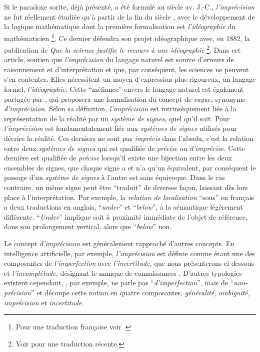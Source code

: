 Si le paradoxe sorite, déjà présenté, a été formulé au
 siècle av. J.-C., \emph{l'imprécision} ne fut
réellement étudiée qu'à partir de la fin du  siècle
\autocite{Williamson1994}, avec le développement de la logique
mathématique dont la première formalisation est \emph{l'idéographie}
du mathématicien \textcite{Frege1879} \footnote{Pour une traduction
  française voir \autocite{Frege1999}.}. Ce dernier défendra son
projet idéographique avec, en 1882, la publication de \emph{Que la
  science justifie le recours à une idéographie} \autocite{Frege1882}
\footnote{Voir \autocite{Frege2019} pour une traduction
  récente.}. Dans cet article,  soutien que
\emph{l'imprécision} du langage naturel est source d'erreurs de
raisonnement et d'interprétation et que, par conséquent, les sciences
ne peuvent s'en contenter. Elles nécessitent un moyen d'expression
plus rigoureux, un langage formel, \emph{l'idéographie.} Cette
\enquote{méfiance} envers le langage naturel est également partagée
par \textcite{Russell1923}, qui proposera une formalisation du concept
de \emph{vague,} synonyme \emph{d'imprécision.} Selon sa définition,
\emph{l'imprécision} est intrinsèquement liée à la représentation de
la réalité par un \emph{système de signes,} quel qu'il soit. Pour
\textcite{Russell1923} \emph{l'imprécision} est fondamentalement liée
aux \emph{systèmes de signes} utilisés pour décrire la réalité. Ces
derniers ne sont pas \emph{imprécis} dans l'absolu, c'est la relation
entre deux \emph{systèmes de signes} qui est qualifiée de
\emph{précise} ou \emph{d'imprécise.} Cette dernière est qualifiée de
\emph{précise} lorsqu'il existe une bijection entre les deux ensembles
de signes, \ie que chaque signe a et n'a qu'un équivalent, par
conséquent le passage d'un \emph{système de signes} à l'autre est sans
équivoque. Dans le cas contraire, un même signe peut être
\enquote{traduit} de diverses façon, laissant dès lors place à
l'interprétation. Par exemple, la \emph{relation de localisation}
\enquote{sous} en français a deux traductions en anglais,
\enquote{\emph{under}} et \enquote{\emph{below}}, à la sémantique
légèrement différente. \enquote{\emph{Under}} implique soit à
proximité immédiate de l'objet de référence, dans son prolongement
vertical, alors que \enquote{\emph{below}} non.

Le concept \emph{d'imprécision} est généralement rapproché d'autres
concepts. En intelligence artificielle, par exemple,
\emph{l'imprécision} est définie comme étant une des composantes de
\emph{l'imperfection} avec \emph{l'incertitude,} que nous présenterons
ci-dessous et \emph{l'incomplétude,} désignant le manque de
connaissances
\autocite{Bouchon-Meunier1995,Bouchon-Meunier2007}. D'autres
typologies existent cependant, \textcite{Niskanen1989}, par exemple,
ne parle pas \enquote{\emph{d'imperfection}}, mais de
\enquote{\emph{non-précision}} et découpe cette notion en quatre
composantes, \emph{généralité,} \emph{ambiguité,} \emph{imprécision}
et \emph{incertitude.}

